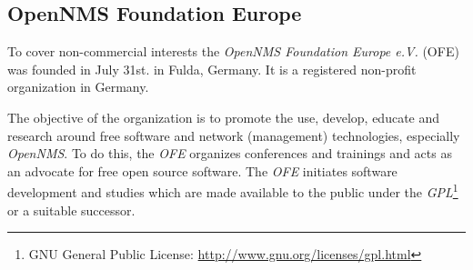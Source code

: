 \subsection*{OpenNMS Foundation Europe}
To cover non-commercial interests the \emph{OpenNMS Foundation Europe e.V.} (OFE) was founded in July 31st. in Fulda, Germany. It is a registered non-profit organization in Germany. 

The objective of the organization is to promote the use, develop, educate and research around free software and network (management) technologies, especially \emph{OpenNMS}. To do this, the \emph{OFE} organizes conferences and trainings and acts as an advocate for free open source software. The \emph{OFE} initiates software development and studies which are made available to the public under the \emph{GPL}\footnote{GNU General Public License: \url{http://www.gnu.org/licenses/gpl.html}} or a suitable successor.
